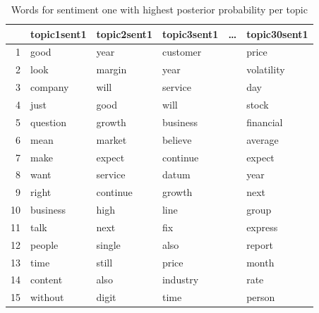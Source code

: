 \begin{table}[ht]
\centering
\begin{tabular}{rlllll}
  \hline
 & topic1sent1 & topic2sent1 & topic3sent1 & \dots & topic30sent1 \\ 
  \hline
1 & good & year & customer & &price \\ 
  2 & look & margin & year & &volatility \\ 
  3 & company & will & service & &day \\ 
  4 & just & good & will & &stock \\ 
  5 & question & growth & business & &financial \\ 
  6 & mean & market & believe & &average \\ 
  7 & make & expect & continue & &expect \\ 
  8 & want & service & datum & &year \\ 
  9 & right & continue & growth & &next \\ 
  10 & business & high & line & &group \\ 
  11 & talk & next & fix & &express \\ 
  12 & people & single & also & &report \\ 
  13 & time & still & price & &month \\ 
  14 & content & also & industry & &rate \\ 
  15 & without & digit & time & &person \\ 
   \hline
\end{tabular}
\caption{Words for sentiment one with highest posterior probability per topic}
\label{tab:postProbSent1}
\end{table}

